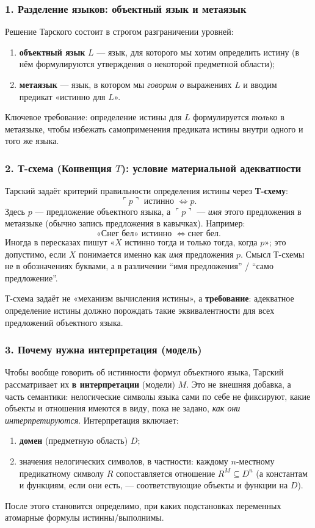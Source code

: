\documentclass[a4paper,12pt]{article}
\begin{document}
\subsubsection*{1. Разделение языков: объектный язык и метаязык}

Решение Тарского состоит в строгом разграничении уровней:
\begin{enumerate}
    \item \textbf{объектный язык} $L$ --- язык, для которого мы хотим определить истину (в нём формулируются утверждения о некоторой предметной области);
    \item \textbf{метаязык} --- язык, в котором мы \emph{говорим о} выражениях $L$ и вводим предикат «истинно для $L$».
\end{enumerate}
Ключевое требование: определение истины для $L$ формулируется \emph{только} в метаязыке, чтобы избежать самоприменения предиката истины внутри одного и того же языка.

\subsubsection*{2. Т-схема (Конвенция $T$): условие материальной адекватности}

Тарский задаёт критерий правильности определения истины через \textbf{Т-схему}:
$$\ulcorner p\urcorner \text{ истинно } \Leftrightarrow p.$$
Здесь $p$ --- предложение объектного языка, а $\ulcorner p\urcorner$ --- \emph{имя} этого предложения в метаязыке (обычно запись предложения в кавычках). Например:
$$\text{«Снег бел» истинно } \Leftrightarrow \text{снег бел}.$$
Иногда в пересказах пишут «$X$ истинно тогда и только тогда, когда $p$»; это допустимо, если $X$ понимается именно как \emph{имя} предложения $p$. Смысл Т-схемы не в обозначениях буквами, а в различении ``имя предложения'' / ``само предложение''.

Т-схема задаёт не «механизм вычисления истины», а \textbf{требование}: адекватное определение истины должно порождать такие эквивалентности для всех предложений объектного языка.

\subsubsection*{3. Почему нужна интерпретация (модель)}

Чтобы вообще говорить об истинности формул объектного языка, Тарский рассматривает их \textbf{в интерпретации} (модели) $M$. Это не внешняя добавка, а часть семантики: нелогические символы языка сами по себе не фиксируют, какие объекты и отношения имеются в виду, пока не задано, \emph{как они интерпретируются}. Интерпретация включает:
\begin{enumerate}
    \item \textbf{домен} (предметную область) $D$;
    \item значения нелогических символов, в частности: каждому $n$-местному предикатному символу $R$ сопоставляется отношение $R^M \subseteq D^n$ (а константам и функциям, если они есть, --- соответствующие объекты и функции на $D$).
\end{enumerate}
После этого становится определимо, при каких подстановках переменных атомарные формулы истинны/выполнимы.
\end{document}
